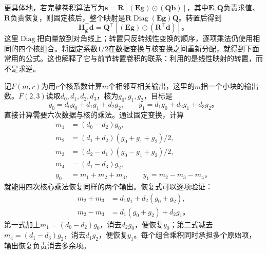 更具体地，若完整卷积算法写为$\bm s=\bm R[(\bm E\bm g)\odot(\bm Q\bm b)]$，其中$\bm E,\bm Q$负责求值、$\bm R$负责恢复，则固定核后，整个映射是$\bm R\operatorname{Diag}(\bm E\bm g)\bm Q$。转置后得到
\[
  \bm H_{\bm g}^\top\bm d
    =\bm Q^\top[(\bm E\bm g)\odot(\bm R^\top\bm d)]\text{。}
\]
这里$\operatorname{Diag}$把向量放到对角线上；转置只反转线性变换的顺序，逐项乘法仍使用相同的四个核组合。将固定系数$1/2$在数据变换与核变换之间重新分配，就得到下面常用的公式。这也解释了它与前节转置卷积的联系：利用的是线性映射的转置，而不是求逆。

记$F(m,r)$为用$r$个核系数计算$m$个相邻互相关输出，这里的$m$指一个小块的输出数。$F(2,3)$读取$d_0,d_1,d_2,d_3$，核为$g_0,g_1,g_2$，目标是
\[
  y_0=d_0g_0+d_1g_1+d_2g_2,\qquad
  y_1=d_1g_0+d_2g_1+d_3g_2\text{。}
\]
直接计算需要六次数据与核的乘法。通过固定变换，计算
\begin{equation}
  \begin{aligned}
    m_1&=(d_0-d_2)g_0,\\
    m_2&=(d_1+d_2)(g_0+g_1+g_2)/2,\\
    m_3&=(d_2-d_1)(g_0-g_1+g_2)/2,\\
    m_4&=(d_1-d_3)g_2,\\
    y_0&=m_1+m_2+m_3,\qquad y_1=m_2-m_3-m_4\text{，}
  \end{aligned}
  \label{eq:cnn-winograd-one-dimensional}
\end{equation}
就能用四次核心乘法恢复同样的两个输出。恢复式可以逐项验证：
\begin{equation}
  \begin{aligned}
    m_2+m_3&=d_1g_1+d_2(g_0+g_2),\\
    m_2-m_3&=d_1(g_0+g_2)+d_2g_1\text{。}
  \end{aligned}
  \label{eq:cnn-winograd-recovery-principle}
\end{equation}
第一式加上$m_1=(d_0-d_2)g_0$，消去$d_2g_0$，便恢复$y_0$；第二式减去$m_4=(d_1-d_3)g_2$，消去$d_1g_2$，便恢复$y_1$。每个组合乘积同时承担多个原始项，输出恢复负责消去多余项。

